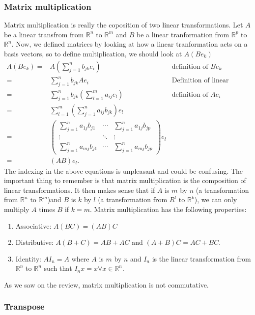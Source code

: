 \documentclass[12pt,reqno]{amsart}
\def\R{\mathbb{R}}
\theoremstyle{definition}
\begin{document}
\subsubsection{Matrix multiplication}
Matrix multiplication is really the coposition of two linear
transformations. Let $A$ be a linear transfrom from $\R^n$ to $\R^m$
and $B$ be a linear tranformation from $\R^p$ to $\R^n$. Now, we
defined matrices by looking at how a linear tranformation acts on a
basis vectors, so to define multiplication, we should look at $A(B
e_k)$
\begin{align*}
  A(B e_k) = & A (\sum_{j=1}^n b_{jk} e_i) & \text{definition of $Be_k$}\\
  = & \sum_{j=1}^n b_{jk} A e_i & \text{Definition of linear
    transformtion} \\
  = & \sum_{j=1}^n b_{jk} \left(\sum_{l=1}^m a_{ij} e_l\right)  &
  \text{definition of $Ae_i$} \\
  = & \sum_{l=1}^m \left(\sum_{j=1}^n a_{ij} b_{jk} \right) e_l \\
  = & \begin{pmatrix} 
    \sum_{j=1}^n a_{1j} b_{j1} & \cdots & \sum_{j=1}^n a_{1j} b_{jp} \\
    \vdots & \ddots & \vdots \\
    \sum_{j=1}^n a_{mj} b_{j1} & \cdots & \sum_{j=1}^n a_{mj} b_{jp}
  \end{pmatrix} e_l \\
  = & (AB) e_l.
\end{align*}
The indexing in the above equations is unpleasant and could be
confusing. The important thing to remember is that matrix
multiplication is the composition of linear transformations. It then
makes sense that if $A$ is $m$ by $n$ (a transformation from $\R^n$ to
$\R^m$)and $B$ is $k$ by $l$ (a transformation from $R^l$ to $\R^k$),
we can only multiply $A$ times $B$ if $k = m$. Matrix multiplication
has the following properties:
\begin{enumerate}
\item Associative: $A(BC) = (AB) C$
\item Distributive: $A(B+C) = AB + AC$ and $(A+B)C = AC + BC$. 
\item Identity: $AI_n = A$ where $A$ is $m$ by $n$ and $I_n$ is the linear
  transformation from $\R^n$ to $\R^n$ such that $I_nx = x \forall x \in
  \R^n$.
\end{enumerate}
As we saw on the review, matrix multiplication is not commutative. 

\subsubsection{Transpose}
\end{document}
